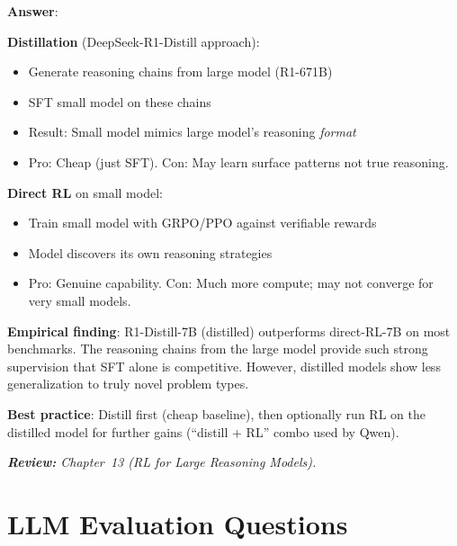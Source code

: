 \begin{questionbox}
\textbf{Answer}:

\textbf{Distillation} (DeepSeek-R1-Distill approach):

\begin{itemize}
  \item Generate reasoning chains from large model (R1-671B)
  \item SFT small model on these chains
  \item Result: Small model mimics large model’s reasoning \emph{format}
  \item Pro: Cheap (just SFT). Con: May learn surface patterns not true reasoning.
\end{itemize}

\textbf{Direct RL} on small model:

\begin{itemize}
  \item Train small model with GRPO/PPO against verifiable rewards
  \item Model discovers its own reasoning strategies
  \item Pro: Genuine capability. Con: Much more compute; may not converge for very small models.
\end{itemize}

\textbf{Empirical finding}: R1-Distill-7B (distilled) outperforms direct-RL-7B on most benchmarks. The reasoning chains from the large model provide such strong supervision that SFT alone is competitive. However, distilled models show less generalization to truly novel problem types.

\textbf{Best practice}: Distill first (cheap baseline), then optionally run RL on the distilled model for further gains (``distill + RL'' combo used by Qwen).

\emph{\textbf{Review:} Chapter~13 (RL for Large Reasoning Models).}
\end{questionbox}

\section{LLM Evaluation Questions}
\label{llm-evaluation-questions}


